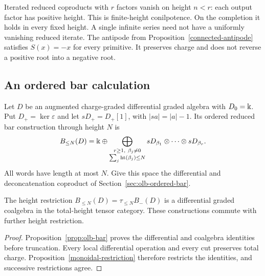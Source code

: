 Iterated reduced coproducts with $r$ factors vanish on height $n<r$:
each output factor has positive height.  This is finite-height
conilpotence.  On the completion it holds in every fixed height.
A single infinite series need not have a uniformly vanishing reduced
iterate.  The antipode from Proposition~\ref{connected-antipode} satisfies
$S(x)=-x$ for every primitive.  It preserves charge and does not reverse
a positive root into a negative root.

\subsection{An ordered bar calculation}

Let $D$ be an augmented charge-graded differential graded algebra with
$D_0=\Bbbk$.  Put $D_+=\ker\varepsilon$ and let $sD_+=D_+[1]$, with
$|sa|=|a|-1$.  Its ordered reduced bar construction through height $N$ is
\[
 B_{\leq N}(D)=\Bbbk\oplus
 \bigoplus_{\substack{r\geq1,\ \beta_j\neq0\\
                    \sum_j\operatorname{ht}(\beta_j)\leq N}}
 sD_{\beta_1}\otimes\cdots\otimes sD_{\beta_r}.
\]
All words have length at most $N$. Give this space the differential
and deconcatenation coproduct of Section~\ref{sec:olb-ordered-bar}.

\begin{proposition}\label{bar-restriction}
The height restriction $B_{\leq N}(D)=\tau_{\leq N}B_-(D)$ is a
differential graded coalgebra in the total-height tensor category.
These constructions commute with further height restriction.
\end{proposition}

\begin{proof}
Proposition~\ref{prop:olb-bar} proves the differential and coalgebra
identities before truncation. Every local differential operation and
every cut preserves total charge. Proposition~\ref{monoidal-restriction}
therefore restricts the identities, and successive restrictions agree.
\end{proof}


